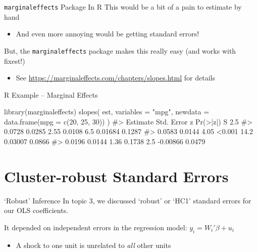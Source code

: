 \documentclass[aspectratio=169,t,11pt,table]{beamer}
\begin{document}
\begin{frame}{\texttt{marginaleffects} Package In R}
  This would be a bit of a pain to estimate by hand
  \begin{itemize}
    \item And even more annoying would be getting standard errors!
  \end{itemize}

  \bigskip
  But, the \texttt{marginaleffects} package makes this really easy (and works with fixest!)
  \begin{itemize}
    \item See \url{https://marginaleffects.com/chapters/slopes.html} for details
  \end{itemize}
\end{frame}

\begin{frame}[fragile]{R Example -- Marginal Effects}
  \begin{codeblock}
library(marginaleffects)
slopes(
  est, variables = "mpg",
  newdata = data.frame(mpg = c(20, 25, 30))
)
#> Estimate  Std. Error     z  Pr(>|z|)     S     2.5 %
#>   0.0728      0.0285  2.55    0.0108   6.5   0.01684  0.1287
#>   0.0583      0.0144  4.05    <0.001  14.2   0.03007  0.0866
#>   0.0196      0.0144  1.36    0.1738   2.5  -0.00866  0.0479
  \end{codeblock}
\end{frame}





\section{Cluster-robust Standard Errors}

\begin{frame}{`Robust' Inference}
  In topic 3, we discussed `robust' or `HC1' standard errors for our OLS coefficients.

  \bigskip
  It depended on \alert{independent errors} in the regression model:
  $y_i = W_i' \beta + u_i$
  \begin{itemize}
    \item A shock to one unit is unrelated to \emph{all} other units
  \end{itemize}
\end{frame}
\end{document}
